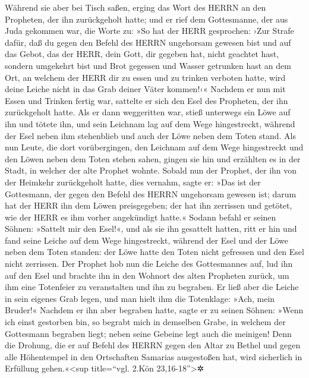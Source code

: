 Während sie aber bei Tisch saßen, erging das Wort des
HERRN an den Propheten, der ihn zurückgeholt hatte; und
er rief dem Gottesmanne, der aus Juda gekommen war, die Worte zu: »So
hat der HERR gesprochen: ›Zur Strafe dafür, daß du gegen den Befehl des
HERRN ungehorsam gewesen bist und auf das Gebot, das der HERR, dein
Gott, dir gegeben hat, nicht geachtet hast, sondern
umgekehrt bist und Brot gegessen und Wasser getrunken hast an dem Ort,
an welchem der HERR dir zu essen und zu trinken verboten hatte, wird
deine Leiche nicht in das Grab deiner Väter kommen!‹«
Nachdem er nun mit Essen und Trinken fertig war, sattelte
er sich den Esel des Propheten, der ihn zurückgeholt hatte.
Als er dann weggeritten war, stieß unterwegs ein Löwe auf
ihn und tötete ihn, und sein Leichnam lag auf dem Wege hingestreckt,
während der Esel neben ihm stehenblieb und auch der Löwe neben dem Toten
stand. Als nun Leute, die dort vorübergingen, den
Leichnam auf dem Wege hingestreckt und den Löwen neben dem Toten stehen
sahen, gingen sie hin und erzählten es in der Stadt, in welcher der alte
Prophet wohnte. Sobald nun der Prophet, der ihn von der
Heimkehr zurückgeholt hatte, dies vernahm, sagte er: »Das ist der
Gottesmann, der gegen den Befehl des HERRN ungehorsam gewesen ist; darum
hat der HERR ihn dem Löwen preisgegeben; der hat ihn zerrissen und
getötet, wie der HERR es ihm vorher angekündigt hatte.«
Sodann befahl er seinen Söhnen: »Sattelt mir den Esel!«,
und als sie ihn gesattelt hatten, ritt er hin und fand
seine Leiche auf dem Wege hingestreckt, während der Esel und der Löwe
neben dem Toten standen: der Löwe hatte den Toten nicht gefressen und
den Esel nicht zerrissen. Der Prophet hob nun die Leiche
des Gottesmannes auf, lud ihn auf den Esel und brachte ihn in den
Wohnort des alten Propheten zurück, um ihm eine Totenfeier zu
veranstalten und ihn zu begraben. Er ließ aber die Leiche
in sein eigenes Grab legen, und man hielt ihm die Totenklage: »Ach, mein
Bruder!« Nachdem er ihn aber begraben hatte, sagte er zu
seinen Söhnen: »Wenn ich einst gestorben bin, so begrabt mich in
demselben Grabe, in welchem der Gottesmann begraben liegt; neben seine
Gebeine legt auch die meinigen! Denn die Drohung, die er
auf Befehl des HERRN gegen den Altar zu Bethel und gegen alle
Höhentempel in den Ortschaften Samarias ausgestoßen hat, wird sicherlich
in Erfüllung gehen.«\textless sup title=``vgl. 2.Kön
23,16-18''\textgreater✲

